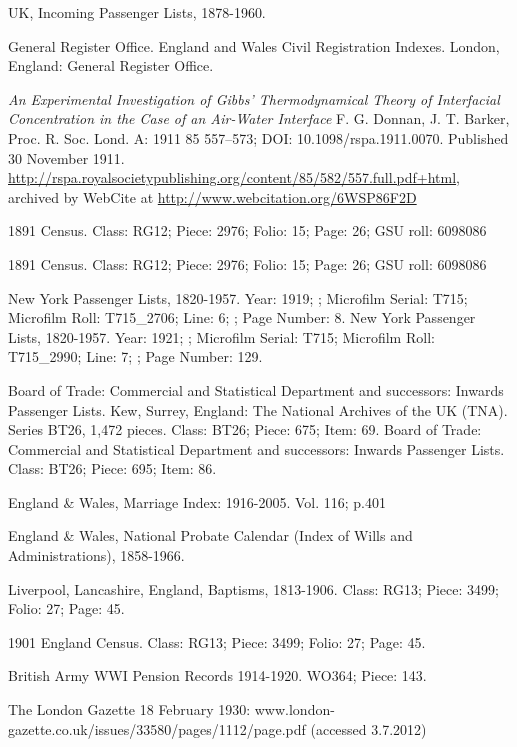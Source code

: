 \begin{thebibliography}{99}
	UK, Incoming Passenger Lists, 1878-1960. 
	
	General Register Office. England and Wales Civil Registration Indexes. London, England: General Register Office. 

	\emph{An Experimental Investigation of Gibbs' Thermodynamical Theory of Interfacial Concentration in the Case of an Air-Water Interface}
	F. G. Donnan, J. T. Barker,
	Proc. R. Soc. Lond. A: 1911 85 557--573; DOI: 10.1098/rspa.1911.0070. Published 30 November 1911.
	\url{http://rspa.royalsocietypublishing.org/content/85/582/557.full.pdf+html},
	archived by WebCite at \url{http://www.webcitation.org/6WSP86F2D}

	 1891 Census. Class: RG12; Piece: 2976; Folio: 15; Page: 26; GSU roll: 6098086
	 
	1891 Census. Class: RG12; Piece: 2976; Folio: 15; Page: 26; GSU roll: 6098086
	
	New York Passenger Lists, 1820-1957.
	Year: 1919; ; Microfilm Serial: T715; Microfilm Roll: T715\_2706; Line: 6; ; Page Number: 8.
	New York Passenger Lists, 1820-1957.
	Year: 1921; ; Microfilm Serial: T715; Microfilm Roll: T715\_2990; Line: 7; ; Page Number: 129.
	
	Board of Trade: Commercial and Statistical Department and successors: Inwards Passenger Lists. Kew, Surrey, England: The National Archives of the UK (TNA). Series BT26, 1,472 pieces.
	Class: BT26; Piece: 675; Item: 69.
	Board of Trade: Commercial and Statistical Department and successors: Inwards Passenger Lists.
	Class: BT26; Piece: 695; Item: 86.
	
	England \& Wales, Marriage Index: 1916-2005. Vol. 116; p.401

	 England \& Wales, National Probate Calendar (Index of Wills and Administrations), 1858-1966. 
	
	Liverpool, Lancashire, England, Baptisms, 1813-1906.
	Class: RG13; Piece: 3499; Folio: 27; Page: 45.
	
	1901 England Census.
	Class: RG13; Piece: 3499; Folio: 27; Page: 45.

	British Army WWI Pension Records 1914-1920.  WO364; Piece: 143.

	 The London Gazette 18 February 1930: www.london-gazette.co.uk/issues/33580/pages/1112/page.pdf (accessed 3.7.2012)


\end{thebibliography}

